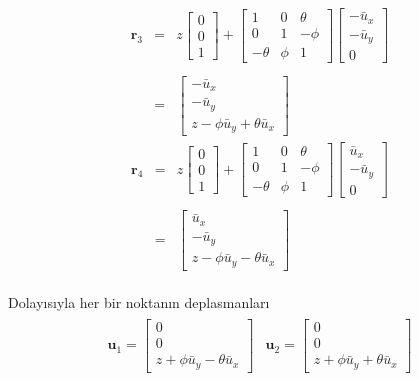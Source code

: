 \documentclass[a4paper]{report}
\begin{document}
\begin{eqnarray*}
\mathbf{r}_3&=&z\left[\begin{array}{c} 0\\ 0\\ 1\end{array} \right]+\left[\begin{array}{ccc} 1 & 0 & \theta\\ 0 & 1 & - \phi\\ -\theta & \phi & 1 \end{array}\right] \left[\begin{array}{c} -\bar{u}_x\\ -\bar{u}_y\\ 0\end{array} \right]
\\
\\
&=& \left[\begin{array}{c} -\bar{u}_{x}\\-\bar{u}_{y}\\ z -\phi \bar{u}_{y} + \theta \bar{u}_{x} \end{array} \right]
\end{eqnarray*}
\begin{eqnarray*}
\mathbf{r}_4&=&z\left[\begin{array}{c} 0\\ 0\\ 1\end{array} \right]+\left[\begin{array}{ccc} 1 & 0 & \theta\\ 0 & 1 & - \phi\\ -\theta & \phi & 1 \end{array}\right] \left[\begin{array}{c} \bar{u}_x\\ -\bar{u}_y\\ 0\end{array} \right]
\\
\\
&=& \left[\begin{array}{c} \bar{u}_{x}\\ -\bar{u}_{y}\\ z -\phi \bar{u}_{y} - \theta \bar{u}_{x} \end{array} \right]
\end{eqnarray*}\\
Dolayısıyla her bir noktanın deplasmanları\\
\begin{eqnarray*}
\begin{array}{cc}
\mathbf{u}_1=\left[\begin{array}{c} 0\\ 0\\ z +\phi \bar{u}_{y} - \theta \bar{u}_{x} \end{array} \right]& \mathbf{u}_2=\left[\begin{array}{c} 0\\ 0\\ z +\phi \bar{u}_{y} + \theta \bar{u}_{x} \end{array} \right]
\end{array}
\end{eqnarray*}
\end{document}
